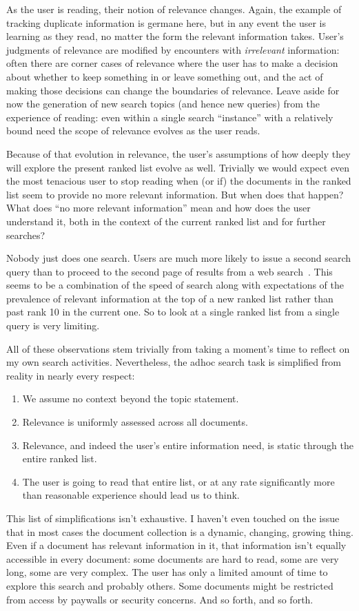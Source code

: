 \documentclass[nobib]{tufte-book}
\begin{document}
As the user is reading, their notion of relevance changes.  Again, the example of tracking duplicate information is germane here, but in any event the user is learning as they read, no matter the form the relevant information takes.  User's judgments of relevance are modified by encounters with {\em irrelevant} information: often there are corner cases of relevance where the user has to make a decision about whether to keep something in or leave something out, and the act of making those decisions can change the boundaries of relevance.  Leave aside for now the generation of new search topics (and hence new queries) from the experience of reading: even within a single search ``instance'' with a relatively bound need the scope of relevance evolves as the user reads.

Because of that evolution in relevance, the user's assumptions of how deeply they will explore the present ranked list evolve as well.  Trivially we would expect even the most tenacious user to stop reading when (or if) the documents in the ranked list seem to provide no more relevant information.  But when does that happen?  What does ``no more relevant information'' mean and how does the user understand it, both in the context of the current ranked list and for further searches?

Nobody just does one search.  Users are much more likely to issue a second search query than to proceed to the second page of results from a web search~\autocite{ref-missing}.  This seems to be a combination of the speed of search along with expectations of the prevalence of relevant information at the top of a new ranked list rather than past rank 10 in the current one.  So to look at a single ranked list from a single query is very limiting.

All of these observations stem trivially from taking a moment's time to reflect on my own search activities.  Nevertheless, the adhoc search task is simplified from reality in nearly every respect:
\begin{enumerate}
    \item We assume no context beyond the topic statement.
    \item Relevance is uniformly assessed across all documents.
    \item Relevance, and indeed the user's entire information need, is static through the entire ranked list.
    \item The user is going to read that entire list, or at any rate significantly more than reasonable experience should lead us to think.
\end{enumerate}
This list of simplifications isn't exhaustive.  I haven't even touched on the issue that in most cases the document collection is a dynamic, changing, growing thing.  Even if a document has relevant information in it, that information isn't equally accessible in every document: some documents are hard to read, some are very long, some are very complex.  The user has only a limited amount of time to explore this search and probably others.  Some documents might be restricted from access by paywalls or security concerns.  And so forth, and so forth.
\end{document}
